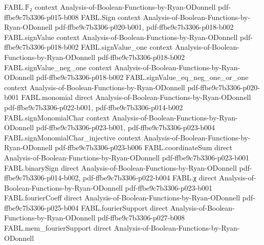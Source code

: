 \begin{theorem}
\label{FABL.tendsto_expect_hammingUpperTailIndicator_mul_normalizedRademacherSum}
\leanok
{}
\proofstep
  {FABL.𝔽₂}
  {context}
  {Analysis-of-Boolean-Functions-by-Ryan-ODonnell}
  {pdf-ffbe9c7b3306-p015-b008}
\proofstep
  {FABL.Sign}
  {context}
  {Analysis-of-Boolean-Functions-by-Ryan-ODonnell}
  {pdf-ffbe9c7b3306-p020-b001,
    pdf-ffbe9c7b3306-p018-b002}
\proofstep
  {FABL.signValue}
  {context}
  {Analysis-of-Boolean-Functions-by-Ryan-ODonnell}
  {pdf-ffbe9c7b3306-p018-b002}
\proofstep
  {FABL.signValue_one}
  {context}
  {Analysis-of-Boolean-Functions-by-Ryan-ODonnell}
  {pdf-ffbe9c7b3306-p018-b002}
\proofstep
  {FABL.signValue_neg_one}
  {context}
  {Analysis-of-Boolean-Functions-by-Ryan-ODonnell}
  {pdf-ffbe9c7b3306-p018-b002}
\proofstep
  {FABL.signValue_eq_neg_one_or_one}
  {context}
  {Analysis-of-Boolean-Functions-by-Ryan-ODonnell}
  {pdf-ffbe9c7b3306-p020-b001}
\proofstep
  {FABL.monomial}
  {direct}
  {Analysis-of-Boolean-Functions-by-Ryan-ODonnell}
  {pdf-ffbe9c7b3306-p022-b001,
    pdf-ffbe9c7b3306-p014-b002}
\proofstep
  {FABL.signMonomialChar}
  {context}
  {Analysis-of-Boolean-Functions-by-Ryan-ODonnell}
  {pdf-ffbe9c7b3306-p023-b001,
    pdf-ffbe9c7b3306-p023-b004}
\proofstep
  {FABL.signMonomialChar_injective}
  {context}
  {Analysis-of-Boolean-Functions-by-Ryan-ODonnell}
  {pdf-ffbe9c7b3306-p023-b006}
\proofstep
  {FABL.coordinateSum}
  {direct}
  {Analysis-of-Boolean-Functions-by-Ryan-ODonnell}
  {pdf-ffbe9c7b3306-p023-b001}
\proofstep
  {FABL.binarySign}
  {direct}
  {Analysis-of-Boolean-Functions-by-Ryan-ODonnell}
  {pdf-ffbe9c7b3306-p014-b002,
    pdf-ffbe9c7b3306-p022-b004}
\proofstep
  {FABL.χ}
  {direct}
  {Analysis-of-Boolean-Functions-by-Ryan-ODonnell}
  {pdf-ffbe9c7b3306-p023-b001}
\proofstep
  {FABL.fourierCoeff}
  {direct}
  {Analysis-of-Boolean-Functions-by-Ryan-ODonnell}
  {pdf-ffbe9c7b3306-p025-b004}
\proofstep
  {FABL.fourierSupport}
  {direct}
  {Analysis-of-Boolean-Functions-by-Ryan-ODonnell}
  {pdf-ffbe9c7b3306-p027-b008}
\proofstep
  {FABL.mem_fourierSupport}
  {direct}
  {Analysis-of-Boolean-Functions-by-Ryan-ODonnell}

\end{theorem}
